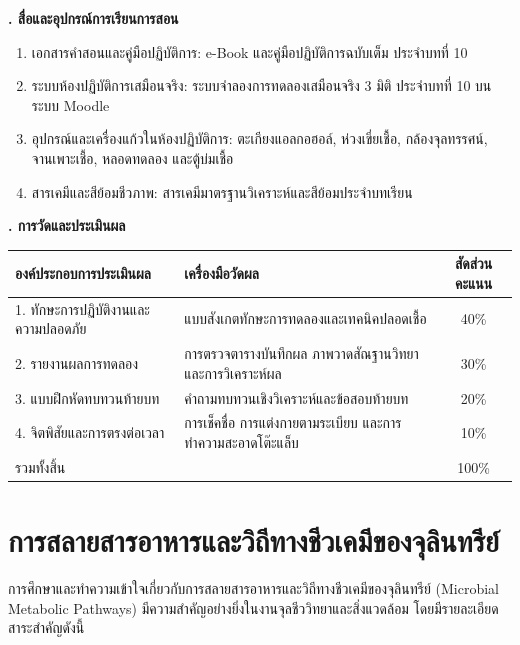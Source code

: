 \noindent\textbf{. สื่อและอุปกรณ์การเรียนการสอน}

\begin{enumerate}
    \item เอกสารคำสอนและคู่มือปฏิบัติการ: e-Book และคู่มือปฏิบัติการฉบับเต็ม ประจำบทที่ 10
    \item ระบบห้องปฏิบัติการเสมือนจริง: ระบบจำลองการทดลองเสมือนจริง 3 มิติ ประจำบทที่ 10 บนระบบ Moodle
    \item อุปกรณ์และเครื่องแก้วในห้องปฏิบัติการ: ตะเกียงแอลกอฮอล์, ห่วงเขี่ยเชื้อ, กล้องจุลทรรศน์, จานเพาะเชื้อ, หลอดทดลอง และตู้บ่มเชื้อ
    \item สารเคมีและสีย้อมชีวภาพ: สารเคมีมาตรฐานวิเคราะห์และสีย้อมประจำบทเรียน
\end{enumerate}

\noindent\textbf{. การวัดและประเมินผล}

\begin{table}[H]
\centering\small
\begin{tabularx}{\textwidth}{p{} p{} c}
\toprule
\textbf{องค์ประกอบการประเมินผล} & \textbf{เครื่องมือวัดผล} & \textbf{สัดส่วนคะแนน} \\
\midrule
1. ทักษะการปฏิบัติงานและความปลอดภัย & แบบสังเกตทักษะการทดลองและเทคนิคปลอดเชื้อ & 40\% \\
2. รายงานผลการทดลอง & การตรวจตารางบันทึกผล ภาพวาดสัณฐานวิทยา และการวิเคราะห์ผล & 30\% \\
3. แบบฝึกหัดทบทวนท้ายบท & คำถามทบทวนเชิงวิเคราะห์และข้อสอบท้ายบท & 20\% \\
4. จิตพิสัยและการตรงต่อเวลา & การเช็คชื่อ การแต่งกายตามระเบียบ และการทำความสะอาดโต๊ะแล็บ & 10\% \\
รวมทั้งสิ้น &  & 100\% \\
\bottomrule
\end{tabularx}
\end{table}

\newpage


\section{การสลายสารอาหารและวิถีทางชีวเคมีของจุลินทรีย์}

การศึกษาและทำความเข้าใจเกี่ยวกับการสลายสารอาหารและวิถีทางชีวเคมีของจุลินทรีย์ (Microbial Metabolic Pathways) มีความสำคัญอย่างยิ่งในงานจุลชีววิทยาและสิ่งแวดล้อม โดยมีรายละเอียดสาระสำคัญดังนี้

